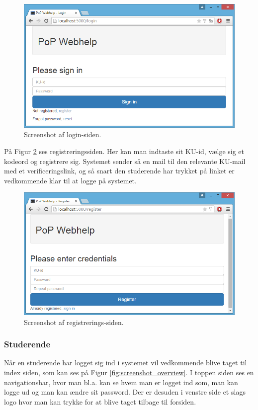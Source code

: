 \documentclass[11pt, a4paper]{article}
\begin{document}
\begin{figure}[htpb]
    \centering
    \includegraphics[width=1\linewidth]{figures/interface/login.png}
    \caption{Screenshot af login-siden.}
    \label{fig:screenshot_login}
\end{figure}

På Figur \ref{fig:screenshot_register} ses registreringssiden. Her kan man indtaste sit KU-id, vælge sig et kodeord og registrere sig. Systemet sender så en mail til den relevante KU-mail med et verificeringslink, og så snart den studerende har trykket på linket er vedkommende klar til at logge på systemet.

\begin{figure}[htpb]
    \centering
    \includegraphics[width=1\linewidth]{figures/interface/register.png}
    \caption{Screenshot af registrerings-siden.}
    \label{fig:screenshot_register}
\end{figure}

\FloatBarrier

\subsubsection{Studerende}
\label{subsub:screenshots_student}
Når en studerende har logget sig ind i systemet vil vedkommende blive taget til index siden, som kan ses på Figur \ref{fig:screenshot_overview}.  I toppen siden ses en navigationsbar, hvor man bl.a. kan se hvem man er logget ind som, man kan logge ud og man kan ændre sit password. Der er desuden i venstre side et slags logo hvor man kan trykke for at blive taget tilbage til forsiden.
\end{document}
